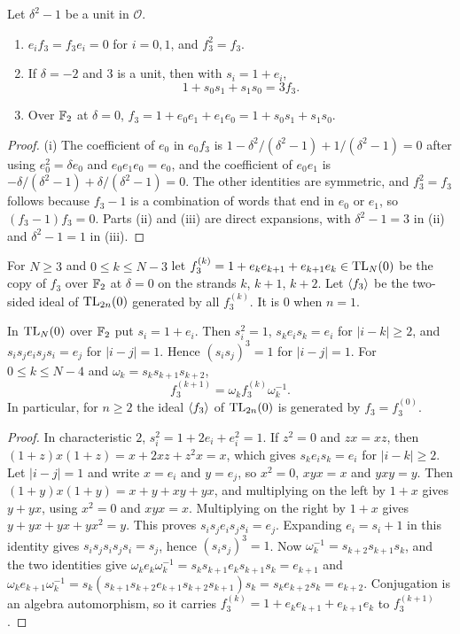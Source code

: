 \begin{proposition}\label{prop:jw}
Let $\delta^2-1$ be a unit in $\mathcal O$.
\begin{enumerate}
\item $e_{i}f_3=f_{3}e_i=0$ for $i=0,1$, and $f_3^2=f_3$.
\item If $\delta=-2$ and $3$ is a unit, then with $s_i=1+e_i$,
\[
1+s_{0}s_1+s_{1}s_0=3f_3 .
\]
\item Over $\mathbb{F}_2$ at $\delta=0$, $f_3=1+e_{0}e_1+e_{1}e_0=1+s_{0}s_1+s_{1}s_0$.
\end{enumerate}
\end{proposition}

\begin{proof}
(i) The coefficient of $e_0$ in $e_{0}f_3$ is $1-\delta^2/(\delta^2-1)+1/(\delta^2-1)=0$ after using $e_0^2=\delta e_0$ and $e_{0}e_{1}e_0=e_0$, and the coefficient of $e_{0}e_1$ is $-\delta/(\delta^2-1)+\delta/(\delta^2-1)=0$. The other identities are symmetric, and $f_3^2=f_3$ follows because $f_3-1$ is a combination of words that end in $e_0$ or $e_1$, so $(f_3-1)f_3=0$. Parts (ii) and (iii) are direct expansions, with $\delta^2-1=3$ in (ii) and $\delta^2-1=1$ in (iii).
\end{proof}

For $N\ge3$ and $0\le k\le N-3$ let $f_3^{(k)}=1+e_{k}e_{k+1}+e_{k+1}e_k\in\mathrm{TL}_N(0)$ be the copy of $f_3$ over $\mathbb{F}_2$ at $\delta=0$ on the strands $k$, $k+1$, $k+2$. Let $\langle f_3\rangle$ be the two-sided ideal of $\mathrm{TL}_{2n}(0)$ generated by all $f_3^{(k)}$. It is $0$ when $n=1$.

\begin{lemma}\label{lem:conj}
In $\mathrm{TL}_N(0)$ over $\mathbb{F}_2$ put $s_i=1+e_i$. Then $s_i^2=1$, $s_{k}e_{i}s_k=e_i$ for $|i-k|\ge2$, and $s_{i}s_{j}e_{i}s_{j}s_i=e_j$ for $|i-j|=1$. Hence ${(s_{i}s_j)}^3=1$ for $|i-j|=1$. For $0\le k\le N-4$ and $\omega_k=s_{k}s_{k+1}s_{k+2}$,
\[
f_3^{(k+1)}=\omega_{k}f_3^{(k)}\omega_k^{-1}.
\]
In particular, for $n\ge2$ the ideal $\langle f_3\rangle$ of $\mathrm{TL}_{2n}(0)$ is generated by $f_3=f_3^{(0)}$.
\end{lemma}

\begin{proof}
In characteristic $2$, $s_i^2=1+2e_i+e_i^2=1$. If $z^2=0$ and $zx=xz$, then $(1+z)x(1+z)=x+2xz+z^{2}x=x$, which gives $s_{k}e_{i}s_k=e_i$ for $|i-k|\ge2$. Let $|i-j|=1$ and write $x=e_i$ and $y=e_j$, so $x^2=0$, $xyx=x$ and $yxy=y$. Then $(1+y)x(1+y)=x+y+xy+yx$, and multiplying on the left by $1+x$ gives $y+yx$, using $x^2=0$ and $xyx=x$. Multiplying on the right by $1+x$ gives $y+yx+yx+yx^2=y$. This proves $s_{i}s_{j}e_{i}s_{j}s_i=e_j$. Expanding $e_i=s_i+1$ in this identity gives $s_{i}s_{j}s_{i}s_{j}s_i=s_j$, hence ${(s_{i}s_j)}^3=1$. Now $\omega_k^{-1}=s_{k+2}s_{k+1}s_k$, and the two identities give $\omega_{k}e_k\omega_k^{-1}=s_{k}s_{k+1}e_{k}s_{k+1}s_k=e_{k+1}$ and $\omega_{k}e_{k+1}\omega_k^{-1}=s_k(s_{k+1}s_{k+2}e_{k+1}s_{k+2}s_{k+1})s_k=s_{k}e_{k+2}s_k=e_{k+2}$. Conjugation is an algebra automorphism, so it carries $f_3^{(k)}=1+e_{k}e_{k+1}+e_{k+1}e_k$ to $f_3^{(k+1)}$.
\end{proof}

